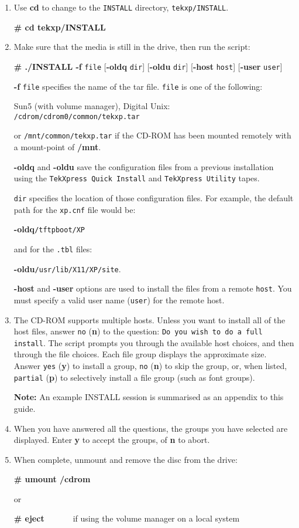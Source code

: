 \begin {enumerate}

\item Use {\bf cd} to change to the {\tt INSTALL} directory,
{\tt tekxp/INSTALL}.

{\bf \# cd tekxp/INSTALL}

\item Make sure that the media is still in the drive, then run the script:

{\bf \# ./INSTALL -f} {\tt file} [{\bf -oldq} {\tt dir}] [{\bf -oldu} {\tt dir}]
[{\bf -host} {\tt host}] [{\bf -user} {\tt user}]

{\bf -f} {\tt file} specifies the name of the tar file. {\tt file} is one of the
following:

Sun5 (with volume manager), Digital Unix: {\tt /cdrom/cdrom0/common/tekxp.tar}

or {\tt /mnt/common/tekxp.tar} if the CD-ROM has been mounted remotely with a
mount-point of {\bf /mnt}.

{\bf -oldq} and {\bf -oldu} save the configuration files from a previous
installation using the {\tt TekXpress Quick Install} and {\tt TekXpress Utility}
tapes.

{\tt dir} specifies the location of those configuration files. For
example, the default path for the {\tt xp.cnf} file would be:

{\bf -oldq}{\tt /tftpboot/XP}

and for the {\tt .tbl} files:

{\bf -oldu}{\tt /usr/lib/X11/XP/site}.

{\bf -host} and {\bf -user} options are used to install the files from a remote
{\tt host}. You must specify a valid user name ({\tt user}) for the remote host.

\item The CD-ROM supports multiple hosts. Unless you want to install all of the
host files, answer {\tt no} ({\bf n}) to the question:
{\tt Do you wish to do a full install}. The script prompts you through the
available host choices, and then through the file choices. Each file group
displays the approximate size. Answer {\tt yes} ({\bf y}) to install a group,
{\tt no} ({\bf n}) to skip the group, or, when listed, {\tt partial} ({\bf p})
to selectively install a file group (such as font groups).

{\bf Note:} An example INSTALL session is summarised as an appendix to this
guide.

\item When you have answered all the questions, the groups you have selected
are displayed. Enter {\bf y} to accept the groups, of {\bf n} to abort.

\item When complete, unmount and remove the disc from the drive:

{\bf \# umount /cdrom}

or

{\bf \# eject}\ \ \ \ \ \ \ if using the volume manager on a local system

\end {enumerate}


